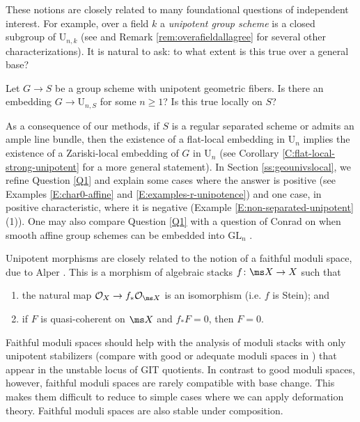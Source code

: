 \documentclass[reqno,a4paper]{amsart}
\numberwithin{Theorem}{section}
\renewcommand{\GL}{\mathrm{GL}}
\renewcommand{\U}{\mathrm{U}}
\theoremstyle{plain}
\theoremstyle{remark}
\begin{document}
These notions are closely related to many foundational questions of
independent interest. For example, over a field $k$ a \emph{unipotent
  group scheme} is a closed subgroup of $\U_{n,k}$ (see
\cite[Thm.~XVII.3.5]{SGA3-III-NEW} and
Remark \ref{rem:overafieldallagree} for several other
characterizations). It is natural to ask: to what extent is this true
over a general base?

\begin{Question} \label{Q1} Let $G \to S$ be a group scheme with
  unipotent geometric fibers. Is there an embedding $G \to \U_{n,S}$ for
  some $n \geq 1$?  Is this true locally on $S$?
\end{Question} 

As a consequence of our methods, if $S$ is a regular separated scheme or admits an ample line bundle,
then the existence of a flat-local embedding in $\U_n$ implies the existence of a Zariski-local embedding of $G$ in $\U_n$ (see Corollary \ref{C:flat-local-strong-unipotent} for a more general statement). In Section \ref{ss:geounivslocal}, we refine Question \ref{Q1} and explain some  cases where the answer is positive (see Examples \ref{E:char0-affine} and \ref{E:examples-r-unipotence}) and one case, in positive characteristic, where it is negative (Example \ref{E:non-separated-unipotent}(1)). One may also
compare Question \ref{Q1} with a question of Conrad on when
smooth affine group schemes can be embedded into $\GL_n$
\cite{mathoverflow_groups-over-dual-numbers}.

Unipotent morphisms are closely related to the notion
of a faithful moduli space, due to Alper \cite{Jarod-faithful}. This is a morphism of algebraic
stacks $f\colon  \ms X \to X$ such that
\begin{enumerate}
\item the natural map $\mathcal{O}_X \to f_*\mathcal{O}_{\ms X}$ is an isomorphism (i.e. $f$ is Stein); and 
\item if $F$ is quasi-coherent on $\ms X$ and $f_*F=0$, then $F=0$.
\end{enumerate}
Faithful moduli spaces should help with the analysis of moduli stacks
with only unipotent stabilizers (compare with good or adequate moduli
spaces in \cite{2008arXiv0804.2242A,MR3272912}) that appear in the
unstable locus of GIT quotients. In contrast to good moduli spaces,
however, faithful moduli spaces are rarely compatible with base
change. This makes them difficult to reduce to simple cases where we
can apply deformation theory. Faithful moduli spaces are also stable
under composition.
\end{document}
